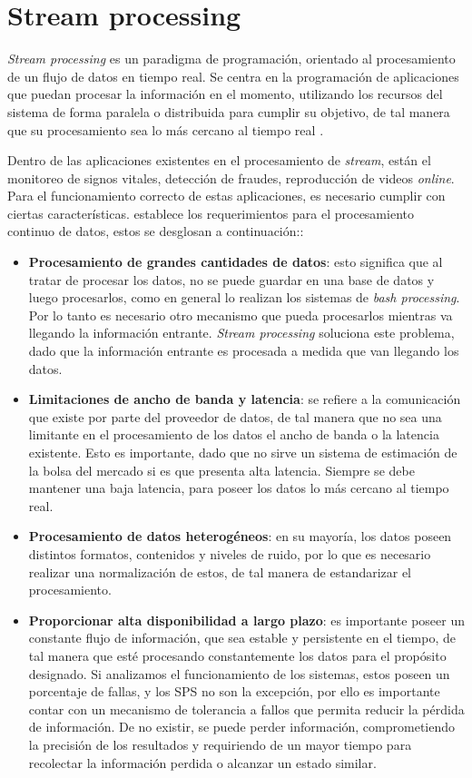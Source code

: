 \section{Stream processing}
\label{sec:streamProcessing}

\textit{Stream processing} es un paradigma de programación, orientado al procesamiento de un flujo de datos en tiempo real. Se centra en la programación de aplicaciones que puedan procesar la información en el momento, utilizando los recursos del sistema de forma paralela o distribuida para cumplir su objetivo, de tal manera que su procesamiento sea lo más cercano al tiempo real \citep{ChakravarthyJ09}.

Dentro de las aplicaciones existentes en el procesamiento de \textit{stream}, están el monitoreo de signos vitales, detección de fraudes, reproducción de videos \textit{online}. Para el funcionamiento correcto de estas aplicaciones, es necesario cumplir con ciertas características. \citep{andrade2014fundamentals} establece los requerimientos para el procesamiento continuo de datos, estos se desglosan a continuación::

\begin{itemize}
	\item \textbf{Procesamiento de grandes cantidades de datos}: esto significa que al tratar de procesar los datos, no se puede guardar en una base de datos y luego procesarlos, como en general lo realizan los sistemas de \textit{bash processing}. Por lo tanto es necesario otro mecanismo que pueda procesarlos mientras va llegando la información entrante. \normalsize{\textit{Stream processing}} soluciona este problema, dado que la información entrante es procesada a medida que van llegando los datos.
	\item \textbf{Limitaciones de ancho de banda y latencia}: se refiere a la comunicación que existe por parte del proveedor de datos, de tal manera que no sea una limitante en el procesamiento de los datos el ancho de banda o la latencia existente. Esto es importante, dado que no sirve un sistema de estimación de la bolsa del mercado si es que presenta alta latencia. Siempre se debe mantener una baja latencia, para poseer los datos lo más cercano al tiempo real.
	\item \textbf{Procesamiento de datos heterogéneos}: en su mayoría, los datos poseen distintos formatos, contenidos y niveles de ruido, por lo que es necesario realizar una normalización de estos, de tal manera de estandarizar el procesamiento.
	\item \textbf{Proporcionar alta disponibilidad a largo plazo}: es importante poseer un constante flujo de información, que sea estable y persistente en el tiempo, de tal manera que esté procesando constantemente los datos para el propósito designado. Si analizamos el funcionamiento de los sistemas, estos poseen un porcentaje de fallas, y los SPS no son la excepción, por ello es importante contar con un mecanismo de tolerancia a fallos que permita reducir la pérdida de información. De no existir, se puede perder información, comprometiendo la precisión de los resultados y requiriendo de un mayor tiempo para recolectar la información perdida o alcanzar un estado similar.
\end{itemize}

